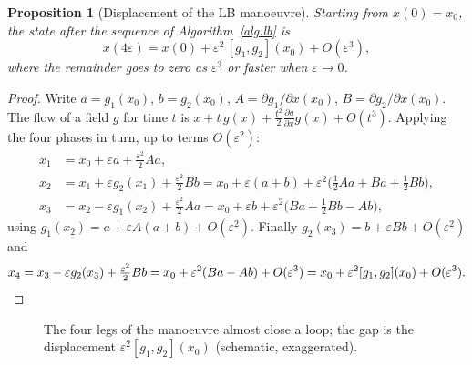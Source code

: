 \documentclass[11pt,a4paper]{article}
\newcommand{\LB}[2]{[#1,#2]}
\theoremstyle{definition}
\theoremstyle{plain}
\newtheorem{proposition}[definition]{Proposition}
\theoremstyle{remark}
\begin{document}
\begin{proposition}[Displacement of the LB manoeuvre]
\label{prop:lbdisp}
Starting from $x(0)=x_0$, the state after the sequence of Algorithm~\ref{alg:lb} is
\[
x(4\varepsilon)=x(0)+\varepsilon^2\,\LB{g_1}{g_2}(x_0)+O(\varepsilon^3),
\]
where the remainder goes to zero as $\varepsilon^3$ or faster when $\varepsilon\to0$.
\end{proposition}
\begin{proof}
Write $a=g_1(x_0)$, $b=g_2(x_0)$, $A=\partial g_1/\partial x(x_0)$, $B=\partial g_2/\partial x(x_0)$. The flow of a field $g$ for time $t$ is $x+t\,g(x)+\tfrac{t^2}{2}\tfrac{\partial g}{\partial x}g(x)+O(t^3)$. Applying the four phases in turn, up to terms $O(\varepsilon^2)$:
\begin{align*}
x_1&=x_0+\varepsilon a+\tfrac{\varepsilon^2}{2}Aa,\\
x_2&=x_1+\varepsilon g_2(x_1)+\tfrac{\varepsilon^2}2Bb=x_0+\varepsilon(a+b)+\varepsilon^2\big(\tfrac12Aa+Ba+\tfrac12Bb\big),\\
x_3&=x_2-\varepsilon g_1(x_2)+\tfrac{\varepsilon^2}2Aa=x_0+\varepsilon b+\varepsilon^2\big(Ba+\tfrac12Bb-Ab\big),
\end{align*}
using $g_1(x_2)=a+\varepsilon A(a+b)+O(\varepsilon^2)$. Finally $g_2(x_3)=b+\varepsilon Bb+O(\varepsilon^2)$ and
\[
x_4=x_3-\varepsilon g_2(x_3)+\tfrac{\varepsilon^2}2Bb=x_0+\varepsilon^2(Ba-Ab)+O(\varepsilon^3)
=x_0+\varepsilon^2\LB{g_1}{g_2}(x_0)+O(\varepsilon^3).\qedhere
\]
\end{proof}

\begin{figure}[H]
\centering
{}
\caption{The four legs of the manoeuvre almost close a loop; the gap is the displacement $\varepsilon^2\LB{g_1}{g_2}(x_0)$ (schematic, exaggerated).}
\label{fig:lbloop}
\end{figure}
\end{document}
